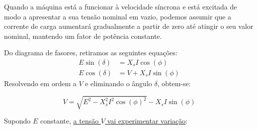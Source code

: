 \noindent Quando a máquina está a funcionar à velocidade síncrona e está excitada de modo a apresentar a sua tensão nominal em vazio, podemos assumir que a corrente de carga aumentará gradualmente a partir de zero até atingir o seu valor nominal, mantendo um fator de potência constante.

\begin{minipage}[b]{0.5\linewidth}
   \begin{figure}[H]
        \centering
    \end{figure} 
\end{minipage}\hfill
\begin{minipage}[b]{0.45\linewidth}
    \noindent Do diagrama de fasores, retiramos as seguintes equações:
    $$
    \begin{aligned}
        E \sin(\delta) &= X_s I \cos(\phi)\\
        E \cos(\delta) &= V + X_s I \sin(\phi)
    \end{aligned}
    $$
    Resolvendo em ordem a $V$  e eliminando o ângulo $\delta$, obtem-se:
    
    $$
        \boxed{V = \sqrt{E^2 - X_s^2 I^2 \cos(\phi)^2} - X_s I \sin(\phi)}
    $$
\end{minipage}

\vspace{1em}
\noindent Supondo $E$ constante, \underline{a tensão $V$ vai experimentar variação}:


